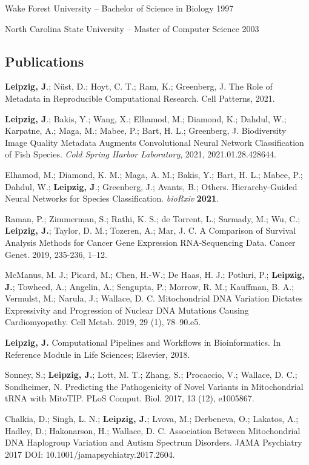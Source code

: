 \documentclass{drexelthesis}
\begin{document}
Wake Forest University – Bachelor of Science in Biology 1997

North Carolina State University – Master of Computer Science 2003

\subsection{Publications}

\textbf{Leipzig, J}.; Nüst, D.; Hoyt, C. T.; Ram, K.; Greenberg, J. The Role of Metadata in Reproducible Computational Research. Cell Patterns, 2021.

\textbf{Leipzig, J}.; Bakis, Y.; Wang, X.; Elhamod, M.; Diamond, K.; Dahdul, W.; Karpatne, A.; Maga, M.; Mabee, P.; Bart, H. L.; Greenberg, J. Biodiversity Image Quality Metadata Augments Convolutional Neural Network Classification of Fish Species. \textit{Cold Spring Harbor Laboratory}, 2021, 2021.01.28.428644.

Elhamod, M.; Diamond, K. M.; Maga, A. M.; Bakis, Y.; Bart, H. L.; Mabee, P.; Dahdul, W.; \textbf{Leipzig, J}.; Greenberg, J.; Avants, B.; Others. Hierarchy-Guided Neural Networks for Species Classification. \textit{bioRxiv} \textbf{2021}.

Raman, P.; Zimmerman, S.; Rathi, K. S.; de Torrent, L.; Sarmady, M.; Wu, C.; \textbf{Leipzig, J.}; Taylor, D. M.; Tozeren, A.; Mar, J. C. A Comparison of Survival Analysis Methods for Cancer Gene Expression RNA-Sequencing Data. Cancer Genet. 2019, 235-236, 1–12.

McManus, M. J.; Picard, M.; Chen, H.-W.; De Haas, H. J.; Potluri, P.;\textbf{ Leipzig, J.}; Towheed, A.; Angelin, A.; Sengupta, P.; Morrow, R. M.; Kauffman, B. A.; Vermulst, M.; Narula, J.; Wallace, D. C. Mitochondrial DNA Variation Dictates Expressivity and Progression of Nuclear DNA Mutations Causing Cardiomyopathy. Cell Metab. 2019, 29 (1), 78–90.e5.

\textbf{Leipzig, J.} Computational Pipelines and Workflows in Bioinformatics. In Reference Module in Life Sciences; Elsevier, 2018.

Sonney, S.; \textbf{Leipzig, J.}; Lott, M. T.; Zhang, S.; Procaccio, V.; Wallace, D. C.; Sondheimer, N. Predicting the Pathogenicity of Novel Variants in Mitochondrial tRNA with MitoTIP. PLoS Comput. Biol. 2017, 13 (12), e1005867.

Chalkia, D.; Singh, L. N.; \textbf{Leipzig, J.}; Lvova, M.; Derbeneva, O.; Lakatos, A.; Hadley, D.; Hakonarson, H.; Wallace, D. C. Association Between Mitochondrial DNA Haplogroup Variation and Autism Spectrum Disorders. JAMA Psychiatry 2017 DOI: 10.1001/jamapsychiatry.2017.2604.
\end{document}
